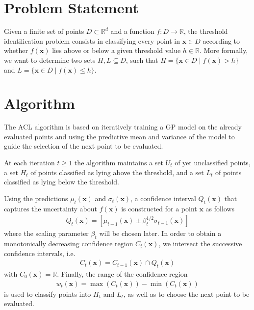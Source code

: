 \documentclass{article}
\def\*#1{\bm{#1}}
\newcommand{\acl}{\textsf{ACL}\xspace}
\begin{document}
 



\section{Problem Statement}
Given a finite set of points $D \subset \mathbb{R}^d$ and a function
${f : D \to \mathbb{R}}$, the threshold identification problem consists in
classifying every point in $\*x \in D$ according to whether $f(\*x)$ lies
above or below a given threshold
value $h\in \mathbb{R}$. More formally, we want to determine two sets
$H, L \subseteq D$, such that
$H = \{\*x \in D \mid f(\*x) > h\}$ and $L = \{\*x \in D \mid f(\*x) \leq h\}$.

\section{Algorithm}
The \acl algorithm is based on iteratively training a GP model on the
already evaluated points and using the predictive mean and variance of the
model to guide the selection of the next point to be evaluated.

At each iteration $t \geq 1$ the algorithm maintains a set $U_t$ of yet
unclassified points, a set $H_t$ of points classified as lying above
the threshold, and a set $L_t$ of points classified as lying below the
threshold.

Using the predictions $\mu_t(\*x)$ and $\sigma_t(\*x)$, a confidence
interval $Q_t(\*x)$ that captures the uncertainty about $f(\*x)$ is constructed
for a point $\*x$ as follows
\begin{align*}
Q_t(\*x) = \left[\mu_{t-1}(\*x) \pm \beta_t^{1/2}\sigma_{t-1}(\*x)\right]
\end{align*}
where the scaling parameter $\beta_t$ will be chosen later.
In order to obtain a monotonically decreasing confidence region $C_t(\*x)$,
we intersect the successive confidence intervals, i.e.
\begin{align*}
C_t(\*x) = C_{t-1}(\*x) \cap Q_t(\*x)
\end{align*}
with $C_0(\*x) = \mathbb{R}$.
Finally, the range of the confidence region
\begin{align*}
w_t(\*x) = \max(C_t(\*x)) - \min(C_t(\*x))
\end{align*}
is used to classify points into $H_t$ and $L_t$, as well as to choose
the next point to be evaluated.
\end{document}
